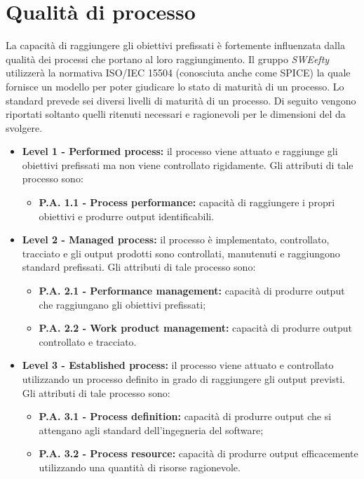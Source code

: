 \section{Qualità di processo}
\label{sec:qdp}
La capacità di raggiungere gli obiettivi prefissati è fortemente influenzata dalla qualità dei processi che portano al loro raggiungimento. Il gruppo \textit{SWEefty} utilizzerà la normativa ISO/IEC 15504 (conosciuta anche come SPICE) la quale fornisce un modello per poter giudicare lo stato di maturità di un processo.
Lo standard prevede sei diversi livelli di maturità di un processo. Di seguito vengono riportati soltanto quelli ritenuti necessari e ragionevoli per le dimensioni del  da svolgere.
\begin{itemize} 
	\item \textbf{Level 1 - Performed process:}
		il  processo  viene  attuato  e  raggiunge  gli
		obiettivi prefissati ma non viene controllato rigidamente.  Gli
		attributi di tale processo sono:
		\begin{itemize}
			\item \textbf{P.A. 1.1 - Process performance:}
			capacità  di  raggiungere  i  propri
			obiettivi e produrre output identificabili.
		\end{itemize}
	\item \textbf{Level 2 - Managed process:}
		il processo è implementato, controllato, tracciato e gli output prodotti sono controllati, manutenuti e raggiungono standard prefissati.  Gli attributi di tale processo sono:
		\begin{itemize}
			\item \textbf{P.A. 2.1 - Performance management:}
				capacità  di  produrre  output che raggiungano gli obiettivi prefissati;
			\item \textbf{P.A. 2.2 - Work product management:}
				capacità di produrre output controllato e tracciato.
		\end{itemize}
	\item \textbf{Level 3 - Established process:}
		il processo viene attuato e controllato utilizzando un processo definito in grado di raggiungere gli output previsti. Gli  attributi  di  tale processo sono:
		\begin{itemize}
			\item \textbf{P.A. 3.1 - Process definition:}
			capacità  di  produrre  output  che  si
			attengano agli standard dell’ingegneria del software;
			\item \textbf{P.A. 3.2 - Process resource:}
			capacità  di  produrre  output  efficacemente utilizzando una quantità di risorse ragionevole.

\end{itemize}
\end{itemize}
